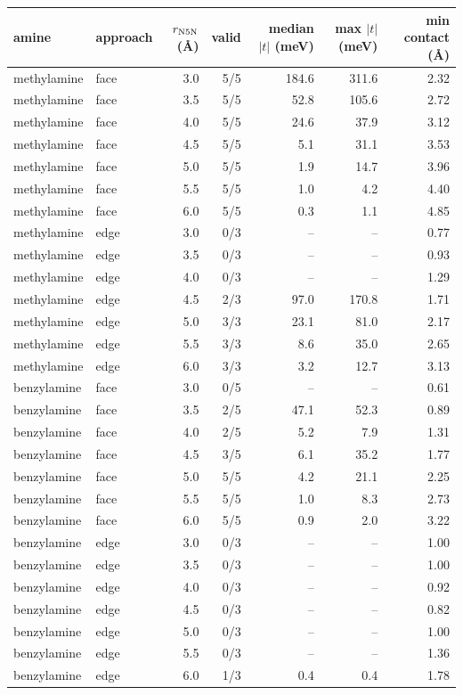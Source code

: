 \small\begin{tabular}{llrrrrr}
\toprule
amine & approach & $r_{\rm N5N}$ (\AA) & valid & median $|t|$ (meV) & max $|t|$ (meV) & min contact (\AA) \\
\midrule
methylamine & face & 3.0 & 5/5 & 184.6 & 311.6 & 2.32 \\
methylamine & face & 3.5 & 5/5 & 52.8 & 105.6 & 2.72 \\
methylamine & face & 4.0 & 5/5 & 24.6 & 37.9 & 3.12 \\
methylamine & face & 4.5 & 5/5 & 5.1 & 31.1 & 3.53 \\
methylamine & face & 5.0 & 5/5 & 1.9 & 14.7 & 3.96 \\
methylamine & face & 5.5 & 5/5 & 1.0 & 4.2 & 4.40 \\
methylamine & face & 6.0 & 5/5 & 0.3 & 1.1 & 4.85 \\
methylamine & edge & 3.0 & 0/3 & -- & -- & 0.77 \\
methylamine & edge & 3.5 & 0/3 & -- & -- & 0.93 \\
methylamine & edge & 4.0 & 0/3 & -- & -- & 1.29 \\
methylamine & edge & 4.5 & 2/3 & 97.0 & 170.8 & 1.71 \\
methylamine & edge & 5.0 & 3/3 & 23.1 & 81.0 & 2.17 \\
methylamine & edge & 5.5 & 3/3 & 8.6 & 35.0 & 2.65 \\
methylamine & edge & 6.0 & 3/3 & 3.2 & 12.7 & 3.13 \\
benzylamine & face & 3.0 & 0/5 & -- & -- & 0.61 \\
benzylamine & face & 3.5 & 2/5 & 47.1 & 52.3 & 0.89 \\
benzylamine & face & 4.0 & 2/5 & 5.2 & 7.9 & 1.31 \\
benzylamine & face & 4.5 & 3/5 & 6.1 & 35.2 & 1.77 \\
benzylamine & face & 5.0 & 5/5 & 4.2 & 21.1 & 2.25 \\
benzylamine & face & 5.5 & 5/5 & 1.0 & 8.3 & 2.73 \\
benzylamine & face & 6.0 & 5/5 & 0.9 & 2.0 & 3.22 \\
benzylamine & edge & 3.0 & 0/3 & -- & -- & 1.00 \\
benzylamine & edge & 3.5 & 0/3 & -- & -- & 1.00 \\
benzylamine & edge & 4.0 & 0/3 & -- & -- & 0.92 \\
benzylamine & edge & 4.5 & 0/3 & -- & -- & 0.82 \\
benzylamine & edge & 5.0 & 0/3 & -- & -- & 1.00 \\
benzylamine & edge & 5.5 & 0/3 & -- & -- & 1.36 \\
benzylamine & edge & 6.0 & 1/3 & 0.4 & 0.4 & 1.78 \\
\bottomrule
\end{tabular}
